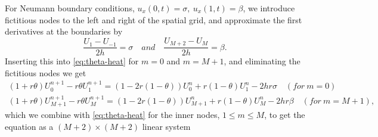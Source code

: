 For Neumann boundary conditions, $u_x(0, t) = \sigma, \: u_x(1, t) = \beta$, 
we introduce fictitious nodes to the left and right of the spatial grid, 
and approximate the first derivatives at the boundaries by
\begin{equation*}
    \frac{U_1 - U_{-1}}{2h} = \sigma
    \quad and \quad
    \frac{U_{M+2} - U_{M}}{2h} = \beta. 
\end{equation*}
Inserting this into \eqref{eq:theta-heat} for $m=0$ and $m=M+1$, 
and eliminating the fictitious nodes we get 
\begin{equation*}
\begin{split}
    (1+r\theta)U_0^{n+1} - r\theta U_1^{n+1} = (1-2r(1-\theta))U_0^n + r(1-\theta)U_1^n - 2hr\sigma
    \quad (for \: m=0) \\
    (1+r\theta)U_{M+1}^{n+1} - r\theta U_M^{n+1} = (1-2r(1-\theta))U_{M+1}^n + r(1-\theta)U_M^n - 2hr\beta
    \quad (for \: m=M+1), 
\end{split}
\end{equation*}
which we combine with \eqref{eq:theta-heat} for the inner nodes, $1 \leq m \leq M$, 
to get the equation as a $(M+2)\times (M+2)$ linear system

